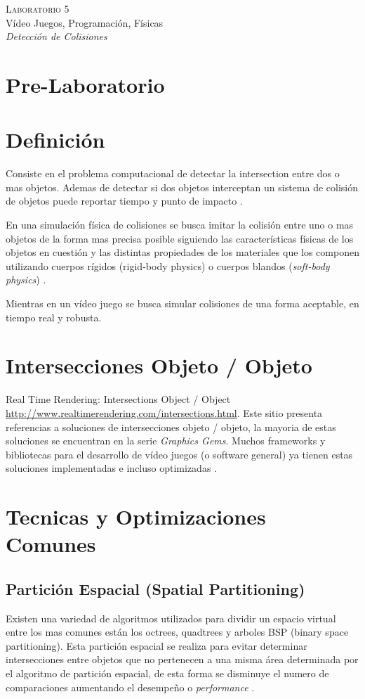 \begin{center}
\textsc{\Large Laboratorio 5}~\\
{\large Vídeo Juegos, Programación, Físicas}~\\
\emph{Detección de Colisiones}
\end{center}


\section{Pre-Laboratorio}

\section{Definición}
Consiste en el problema computacional de detectar la intersection entre dos o mas objetos. Ademas de detectar si dos objetos interceptan un sistema de colisión de objetos puede reportar tiempo y punto de impacto \cite{ericson_collision}.

En una simulación física de colisiones se busca imitar la colisión entre uno o mas objetos de la forma mas precisa posible siguiendo las características físicas de los objetos en cuestión y las distintas propiedades de los materiales que los componen utilizando cuerpos rígidos (rigid-body physics) o cuerpos blandos (\emph{soft-body physics}) \cite[p.~340]{jenkinscreatinggames}.

Mientras en un vídeo juego se busca simular colisiones de una forma aceptable, en tiempo real y robusta.

\section{Intersecciones Objeto / Objeto}
Real Time Rendering: Intersections Object / Object \url{http://www.realtimerendering.com/intersections.html}. Este sitio presenta referencias a soluciones de intersecciones objeto / objeto, la mayoria de estas soluciones se encuentran en la serie \emph{Graphics Gems}. Muchos frameworks y bibliotecas para el desarrollo de vídeo juegos (o software general) ya tienen estas soluciones implementadas e incluso optimizadas \cite{rtr_intersections}.
\section{Tecnicas y Optimizaciones Comunes}
\subsection{Partición Espacial (Spatial Partitioning)}
Existen una variedad de algoritmos utilizados para dividir un espacio virtual entre los mas comunes están los octrees, quadtrees y arboles BSP (binary space partitioning). Esta partición espacial se realiza para evitar determinar intersecciones entre objetos que no pertenecen a una misma área determinada por el algoritmo de partición espacial, de esta forma se disminuye el numero de comparaciones aumentando el desempeño o \emph{performance} \cite{sp_partition}.
